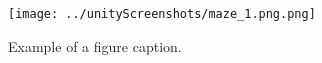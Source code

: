 \documentclass[11pt, conference]{IEEEtran}
\begin{document}
\begin{figure}[htbp]
\centerline{\texttt{[image: ../unityScreenshots/maze\_1.png.png]}}
\caption{Example of a figure caption.}
\label{fig}
\end{figure}







\end{document}
